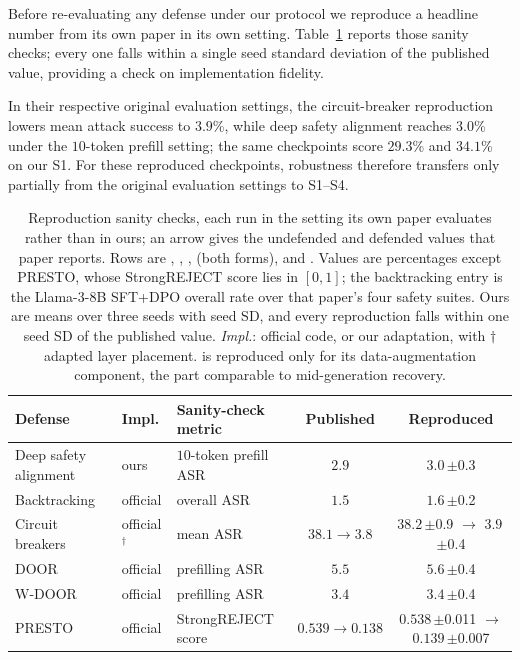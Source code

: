 \documentclass[11pt]{article}
\newcommand{\asr}{ASR}
\begin{document}
Before re-evaluating any defense under our protocol we reproduce a headline
number from its own paper in its own setting. Table~\ref{tab:repro} reports those
sanity checks; every one falls within a single seed standard deviation of the
published value, providing a check on implementation fidelity.

In their respective original evaluation settings, the circuit-breaker
reproduction lowers mean attack success to \(3.9\)\%, while deep safety alignment
reaches \(3.0\)\% under the \(10\)-token prefill setting; the same checkpoints
score \(29.3\)\% and \(34.1\)\% on our S1.
For these reproduced checkpoints, robustness therefore transfers only partially
from the original evaluation settings to S1--S4.

\begin{table}[t]
  \centering
  \footnotesize
  \setlength{\tabcolsep}{4pt}
  \begin{tabular}{lllcc}
    \toprule
    Defense & Impl. & Sanity-check metric & Published & Reproduced \\
    \midrule
    Deep safety alignment & ours
      & \(10\)-token prefill \asr{}
      & \(2.9\) & \(3.0\)\,{\scriptsize$\pm$0.3} \\
    Backtracking & official
      & overall \asr{}
      & \(1.5\) & \(1.6\)\,{\scriptsize$\pm$0.2} \\
    Circuit breakers & official$^\dagger$
      & mean \asr{}
      & \(38.1 \rightarrow 3.8\)
      & \(38.2\)\,{\scriptsize$\pm$0.9} $\rightarrow$ \(3.9\)\,{\scriptsize$\pm$0.4} \\
    DOOR & official
      & prefilling \asr{}
      & \(5.5\) & \(5.6\)\,{\scriptsize$\pm$0.4} \\
    W-DOOR & official
      & prefilling \asr{}
      & \(3.4\) & \(3.4\)\,{\scriptsize$\pm$0.4} \\
    PRESTO & official
      & StrongREJECT score
      & \(0.539 \rightarrow 0.138\)
      & \(0.538\)\,{\scriptsize$\pm$0.011} $\rightarrow$ \(0.139\)\,{\scriptsize$\pm$0.007} \\
    \bottomrule
  \end{tabular}
  \caption{Reproduction sanity checks, each run in the setting its own paper
  evaluates rather than in ours; an arrow gives the undefended and defended
  values that paper reports. Rows are \citet{qi2024safety},
  \citet{zhang2024backtracking}, \citet{zou2024circuit}, \citet{zhao2025door}
  (both forms), and \citet{vega2025presto}. Values are percentages except PRESTO,
  whose StrongREJECT score lies in \([0,1]\); the backtracking entry is the
  Llama-3-8B SFT+DPO overall rate over that paper's four safety suites. Ours are
  means over three seeds
  with seed SD, and every reproduction falls within one seed SD of the published
  value. \emph{Impl.}: official code, or our adaptation, with \(\dagger\) adapted
  layer placement. \citet{qi2024safety} is reproduced only for its
  data-augmentation component, the part comparable to mid-generation recovery.}
  \label{tab:repro}
\end{table}
\end{document}

